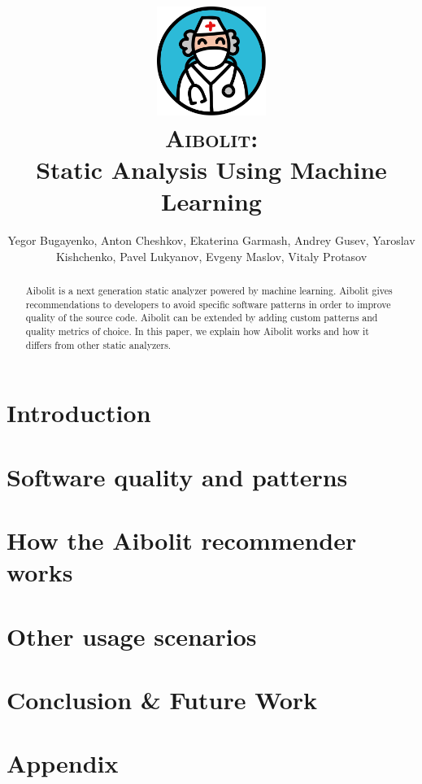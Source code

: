 \documentclass[10pt]{article}
\title{
  \includegraphics[height=100pt]{logo.png}\\
  \vspace{10pt}
  \textsc{Aibolit:}\\
  Static Analysis
  Using Machine Learning}
\author{Yegor Bugayenko, Anton Cheshkov, Ekaterina Garmash, Andrey Gusev, Yaroslav Kishchenko, Pavel Lukyanov, Evgeny Maslov, Vitaly Protasov}
\affil{Huawei Technologies \\
		System Programming Lab, Russian Research Institute, Moscow}
\begin{document}
\maketitle

\pagebreak

\begin{abstract}

Aibolit is a next generation static analyzer powered by machine learning.
Aibolit gives recommendations to developers to avoid specific software patterns  
in order to improve quality of the source code. Aibolit can be extended by adding 
custom patterns and quality metrics of choice. In this paper, we explain 
how Aibolit works and how it differs from other static analyzers.


\end{abstract}

\pagebreak

\section{Introduction}
\label{sec:intro}



\section{Software quality and patterns}
\label{sec:related}


\section{How the Aibolit recommender works}
\label{sec:how_aibolit_works}


\section{Other usage scenarios}
\label{sec:usage_scenarios}



\section{Conclusion \& Future Work}
\label{sec:conclusion}



\section{Appendix}
\label{sec:appendix}


 

\end{document}
